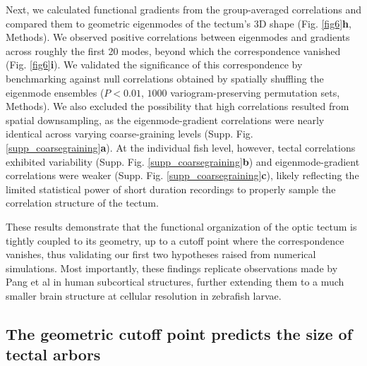 \documentclass{article}
\begin{document}
Next, we calculated functional gradients from the group-averaged correlations and compared them to geometric eigenmodes of the tectum’s 3D shape (Fig. \ref{fig6}\textbf{h}, Methods). We observed positive correlations between eigenmodes and gradients across roughly the first 20 modes, beyond which the correspondence vanished (Fig. \ref{fig6}\textbf{i}). We validated the significance of this correspondence by benchmarking against null correlations obtained by spatially shuffling the eigenmode ensembles ($P<0.01$, $1000$ variogram-preserving permutation sets\cite{burt2020generative}, Methods). We also excluded the possibility that high correlations resulted from spatial downsampling, as the eigenmode-gradient correlations were nearly identical across varying coarse-graining levels (Supp. Fig. \ref{supp_coarsegraining}\textbf{a}). At the individual fish level, however, tectal correlations exhibited variability (Supp. Fig. \ref{supp_coarsegraining}\textbf{b}) and eigenmode-gradient correlations were weaker (Supp. Fig. \ref{supp_coarsegraining}\textbf{c}), likely reflecting the limited statistical power of short duration recordings to properly sample the correlation structure of the tectum.

These results demonstrate that the functional organization of the optic tectum is tightly coupled to its geometry, up to a cutoff point where the correspondence vanishes, thus validating our first two hypotheses raised from numerical simulations. Most importantly, these findings replicate observations made by Pang et al in human subcortical structures\cite{pang2023geometric}, further extending them to a much smaller brain structure at cellular resolution in zebrafish larvae.

\subsection*{The geometric cutoff point predicts the size of tectal arbors}
\end{document}
